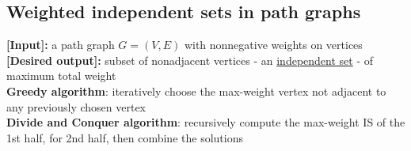 \documentclass[a4paper,12pt]{article}
\theoremstyle{plain}
\theoremstyle{definition}
\theoremstyle{remark}
\begin{document}
\subsection{Weighted independent sets in path graphs}
\textbf{[Input]:} a path graph $G = (V, E)$ with nonnegative weights on vertices
\\

\textbf{[Desired output]:} subset of nonadjacent vertices - an \underline{independent set} - of maximum total weight
\\

\textbf{Greedy algorithm}: iteratively choose the max-weight vertex not adjacent to any previously chosen vertex
\\

\textbf{Divide and Conquer algorithm}: recursively compute the max-weight IS of the 1st half, for 2nd half, then combine the solutions
\end{document}
